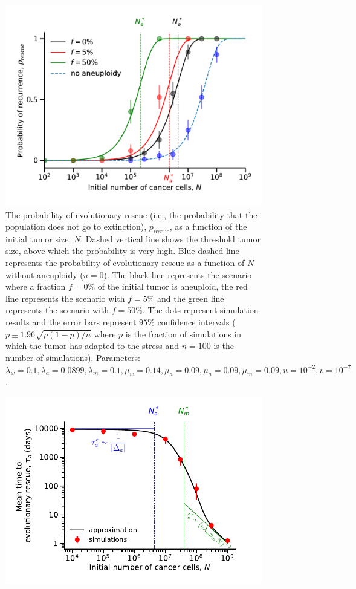 \documentclass[12pt]{extarticle}
\newcommand{\presc}{p_\text{rescue}}
\begin{document}
\begin{appendices}
\begin{figure}
\includegraphics[width=1\textwidth]{Figures/ProbvN_SGV_Plot.pdf}
\caption{The probability of evolutionary rescue (i.e., the probability that the population does not go to extinction), $\presc$, as a function of the initial tumor size, $N$. Dashed vertical line shows the threshold tumor size, above which the probability is very high. Blue dashed line represents the probability of evolutionary rescue as a function of $N$ without aneuploidy ($u=0$). The black line represents the scenario where a fraction $f=0\%$ of the initial tumor is aneuploid, the red line represents the scenario with $f=5\%$ and the green line represents the scenario with $f=50\%$. The dots represent simulation results and the error bars represent $95\%$ confidence intervals ($p\pm1.96\sqrt{p\left(1-p\right)/n}$ where $p$ is the fraction of simulations in which the tumor has adapted to the stress and $n=100$ is the number of simulations). Parameters: $\lambda_w=0.1,\lambda_a=0.0899,\lambda_m=0.1,\mu_w=0.14,\mu_a=0.09,\mu_a=0.09,\mu_m=0.09, u=10^{-2}, v=10^{-7}$.}
\label{rescue_prob_sgv}
\end{figure}
\begin{figure}
\vspace*{1\baselineskip}
\includegraphics[width=1\textwidth]{Figures/EvolutionaryRescueTimeComplete.pdf}

\end{figure}
\end{appendices}
\end{document}
